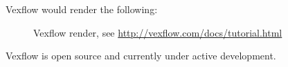 Vexflow would render the following:


\begin{figure}[h!]
  \centering
  \caption{Vexflow render, see \url{http://vexflow.com/docs/tutorial.html}}
  \label{fig:VexflowOutput}
\end{figure}

Vexflow is open source and currently under active development.

